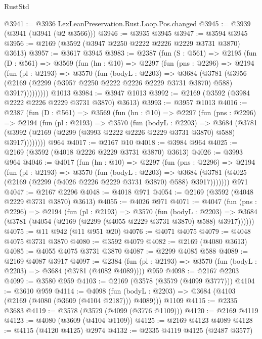 \begin{lexlean}{RustStd}
\begin{coremodule}
@3941 := @3936 LexLeanPreservation.Rust.Loop.Pos.changed
@3945 := @3939 (@3941 (@3941 (@2 @3566)))
@3946 := @3935 @3945
@3947 := @3594 @3945
@3956 := @2169 (@3592 (@3947 @2250 @2222 @2226 @2229 @3731 @3870) @3613)
@3957 := @3617 @3945
@3983 := @2387
    (fun (S : @561) =>
    @2195
      (fun (D : @561) =>
      @3569
        (fun (hn : @10) =>
        @2297
          (fun (pns : @2296) =>
          @2194
            (fun (pl : @2193) =>
            @3570
              (fun (bodyL : @2203) =>
              @3684
                (@3781
                  (@3956
                    (@2169 (@2299 (@3957 @2250 @2222 @2226 @2229 @3731 @3870) @588) @3917)))))))))
    @1013
@3984 := @3947 @1013
@3992 := @2169 (@3592 (@3984 @2222 @2226 @2229 @3731 @3870) @3613)
@3993 := @3957 @1013
@4016 := @2387
    (fun (D : @561) =>
    @3569
      (fun (hn : @10) =>
      @2297
        (fun (pns : @2296) =>
        @2194
          (fun (pl : @2193) =>
          @3570
            (fun (bodyL : @2203) =>
            @3684
              (@3781 (@3992 (@2169 (@2299 (@3993 @2222 @2226 @2229 @3731 @3870) @588) @3917))))))))
    @964
@4017 := @2167 @10
@4018 := @3984 @964
@4025 := @2169 (@3592 (@4018 @2226 @2229 @3731 @3870) @3613)
@4026 := @3993 @964
@4046 := @4017
    (fun (hn : @10) =>
    @2297
      (fun (pns : @2296) =>
      @2194
        (fun (pl : @2193) =>
        @3570
          (fun (bodyL : @2203) =>
          @3684 (@3781 (@4025 (@2169 (@2299 (@4026 @2226 @2229 @3731 @3870) @588) @3917)))))))
    @971
@4047 := @2167 @2296
@4048 := @4018 @971
@4054 := @2169 (@3592 (@4048 @2229 @3731 @3870) @3613)
@4055 := @4026 @971
@4071 := @4047
    (fun (pns : @2296) =>
    @2194
      (fun (pl : @2193) =>
      @3570
        (fun (bodyL : @2203) =>
        @3684 (@3781 (@4054 (@2169 (@2299 (@4055 @2229 @3731 @3870) @588) @3917))))))
@4075 := @11 @942 (@11 @951 @20)
@4076 := @4071 @4075
@4079 := @4048 @4075 @3731 @3870
@4080 := @3592 @4079
@4082 := @2169 (@4080 @3613)
@4085 := @4055 @4075 @3731 @3870
@4087 := @2299 @4085 @588
@4089 := @2169 @4087 @3917
@4097 := @2384 (fun (pl : @2193) => @3570 (fun (bodyL : @2203) => @3684 (@3781 (@4082 @4089)))) @959
@4098 := @2167 @2203
@4099 := @3580 @959
@4103 := @2169 (@3578 (@3579 (@4099 @3777)))
@4104 := @3610 @959
@4114 := @4098
    (fun (bodyL : @2203) => @3684 (@4103 (@2169 (@4080 (@3609 (@4104 @2187))) @4089)))
    @1109
@4115 := @2335 @3683
@4119 := @3578 (@3579 (@4099 (@3776 @1109)))
@4120 := @2169 @4119
@4123 := @4080 (@3609 (@4104 @1109))
@4125 := @2169 @4123 @4089
@4128 := @4115 (@4120 @4125) @2974
@4132 := @2335 @4119 @4125 (@2487 @3577)

\end{coremodule}
\end{lexlean}
